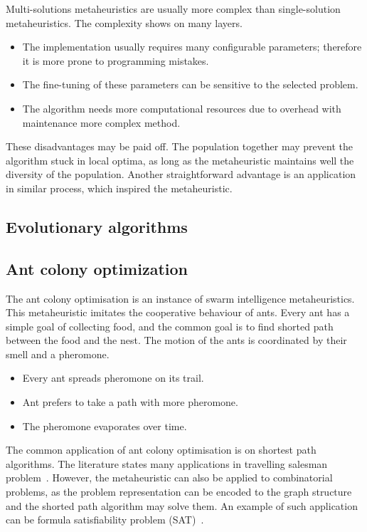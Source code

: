 \documentclass[
  print, %
  Table,   %
  nolof,     %
  nolot,     %
  11pt, %
  oneside  %
]{fithesis3}
\begin{document}
Multi-solutions metaheuristics are usually more complex than single-solution metaheuristics. The complexity shows on many layers.

\begin{itemize}
    \item The implementation usually requires many configurable parameters; therefore it is more prone to programming mistakes.
    \item The fine-tuning of these parameters can be sensitive to the selected problem.
    \item The algorithm needs more computational resources due to overhead with maintenance more complex method.
\end{itemize}

These disadvantages may be paid off. The population together may prevent the algorithm stuck in local optima, as long as the metaheuristic maintains well the diversity of the population. Another straightforward advantage is an application in similar process, which inspired the metaheuristic.

\subsection{Evolutionary algorithms}
\label{subsec:opt-multi-sol-ea}



\subsection{Ant colony optimization}
\label{subsec:opt-multi-sol-aco}

The ant colony optimisation is an instance of swarm intelligence metaheuristics. This metaheuristic imitates the cooperative behaviour of ants. Every ant has a simple goal of collecting food, and the common goal is to find shorted path between the food and the nest. The motion of the ants is coordinated by their smell and a pheromone.

\begin{itemize}
    \item Every ant spreads pheromone on its trail.
    \item Ant prefers to take a path with more pheromone.
    \item The pheromone evaporates over time.
\end{itemize}

The common application of ant colony optimisation is on shortest path algorithms. The literature states many applications in travelling salesman problem~\cite{dorigo1997ant, dorigo1997ant}. However, the metaheuristic can also be applied to combinatorial problems, as the problem representation can be encoded to the graph structure and the shorted path algorithm may solve them. An example of such application can be formula satisfiability problem (SAT)~\cite{moritz2010solving}.
\end{document}
